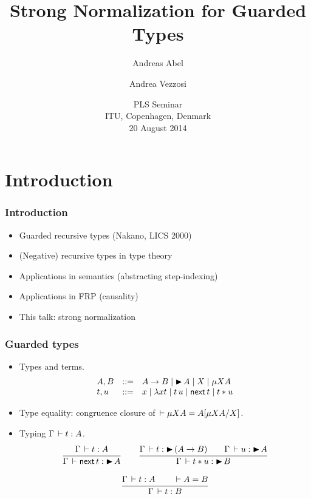 \documentclass[t]{beamer}
\title[SN Guarded Types]{%
  Strong Normalization for Guarded Types}
\author[Abel Vezzosi]{
  Andreas Abel
  \and Andrea Vezzosi
}
\institute[Chalmers/GU] %
{
  Department of Computer Science and Engineering\\
  Chalmers and Gothenburg University, Sweden \\[1ex]
}
\date[ITU 2014] %
{ PLS Seminar \\
  ITU, Copenhagen, Denmark \\
  20 August 2014}
\newcommand{\nex}{\tnext\,}
\begin{document}
\maketitle



\section{Introduction}


\begin{frame}%
  \frametitle{Introduction}
  \begin{itemize}
  \item Guarded recursive types (Nakano, LICS 2000)
  \item (Negative) recursive types in type theory
  \item Applications in semantics (abstracting step-indexing)
  \item Applications in FRP (causality)
  \item This talk: strong normalization
  \end{itemize}
\end{frame}


\begin{frame}%
  \frametitle{Guarded types}
  \begin{itemize}
  \item Types and terms.
\[
\begin{array}{lrl}
  A,B & ::= &  A \to B \mid \later A \mid X \mid \mu X A
\\
  t,u & ::= & x \mid \lambda x t \mid t \, u \mid \nex t \mid t \ast u
\end{array}
\]
  \item Type equality: congruence closure of $\der \mu X A = \subst
    {\mu X A} X A$.
  \item Typing $\Gamma \der t : A$.
\begin{gather*}
   \ru{\Gamma \der t : A}{\Gamma \der \nex t : \later A}
\qquad
   \ru{\Gamma \der t : \later(A \to B) \qquad
       \Gamma \der u : \later A
     }{\Gamma \der t \ast u : \later B}
\\[2ex]
  \ru{\Gamma \der t : A \qquad \der A = B
    }{\Gamma \der t : B}
\end{gather*}
  \end{itemize}
\end{frame}
\end{document}
